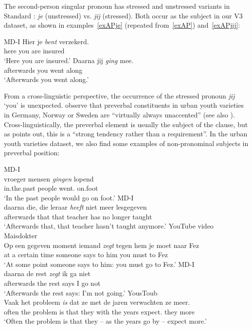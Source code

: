 \documentclass[output=paper]{langsci/langscibook}
\begin{document}
\noindent The second-person singular pronoun has stressed and unstressed
variants in Standard : \emph{je} (unstressed) vs. \emph{jij}
(stressed). Both occur as the subject in our V3 dataset, as shown in
examples~\eqref{exAPje} (repeated from~\ref{exAP}) and~\eqref{exAPjij}:

\ea MD-I
    \ea
    \gll\label{exAPje}Hier je \textit{bent} verzekerd.\\
    here you are insured\\
    \trans \enquote*{Here you are insured.}
    \ex
    \gll\label{exAPjij}Daarna jij \textit{ging} mee.\\
    afterwards you went along\\
    \trans \enquote*{Afterwards you went along.}
    \z
\z

\noindent From a cross-linguistic perspective, the occurrence of the stressed
pronoun \emph{jij} `you' is unexpected. \citet[84]{Freywaldetal:2015} observe
that preverbal constituents in urban youth varieties in Germany, Norway or
Sweden are \enquote{virtually always unaccented} (see also
\citealt{Walkden:2017}).  Cross-linguistically, the preverbal element is usually
the subject of the clause, but as \textcite{Walkden:2017} points out, this is a
\enquote{strong tendency rather than a requirement}. In the  urban
youth varieties dataset, we also find some examples of non-pronominal subjects
in preverbal position:

\ea\label{ex:16.19}
    \ea\label{exsbjnp} MD-I\\
    \gll\label{exsbjnpa}vroeger mensen \textit{gingen} lopend\\
    in.the.past people went.\Pl{} on.foot\\
    \trans \enquote*{In the past people would go on foot.}
    \ex MD-I\\
    \gll\label{exsbjnpb}daarna die, die leraar \textit{heeft} niet meer lesgegeven\\
    afterwards that that teacher has no longer taught\\
    \trans \enquote*{Afterwards that, that teacher hasn't taught anymore.}
    \ex YouTube video Maisdokter\\
    \gll\label{exsbjnpc}Op een gegeven moment iemand \textit{zegt} tegen hem je moet naar Fez\\
    at a certain time someone says to him you must to Fez\\
    \trans \enquote*{At some point someone says to him: you must go to Fez.}
    \ex MD-I\\
    \gll\label{exsbjnpd}daarna de rest \textit{zegt} ik ga niet\\
    afterwards the rest says I go not\\
    \trans \enquote*{Afterwards the rest says: I'm not going.}
    \ex YousToub\\
    \gll\label{exsbjnpe}Vaak het probleem \textit{is} dat ze met de jaren verwachten ze meer.\\
    often the problem is that they with the years expect.\Pl{} they more\\
    \trans \enquote*{Often the problem is that they -- as the years go by -- expect more.}
    \z
\z
\end{document}
